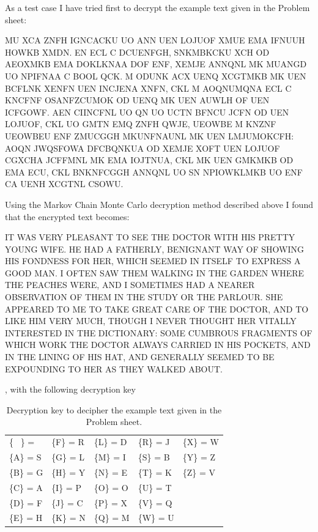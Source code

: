\documentclass[a4paper, 11pt]{article}
\begin{document}
As a test case I have tried first to decrypt the example text given in the
Problem sheet:

\begin{adjustwidth}{2.5em}{0pt}
  \small
  MU XCA ZNFH IGNCACKU UO ANN UEN LOJUOF XMUE EMA IFNUUH
  HOWKB XMDN. EN ECL C DCUENFGH, SNKMBKCKU XCH OD AEOXMKB
  EMA DOKLKNAA DOF ENF, XEMJE ANNQNL MK MUANGD UO NPIFNAA 
  C BOOL QCK. M ODUNK ACX UENQ XCGTMKB MK UEN BCFLNK
  XENFN UEN INCJENA XNFN, CKL M AOQNUMQNA ECL C KNCFNF
  OSANFZCUMOK OD UENQ MK UEN AUWLH OF UEN ICFGOWF. AEN
  CIINCFNL UO QN UO UCTN BFNCU JCFN OD UEN LOJUOF, CKL UO
  GMTN EMQ ZNFH QWJE, UEOWBE M KNZNF UEOWBEU ENF ZMUCGGH
  MKUNFNAUNL MK UEN LMJUMOKCFH: AOQN JWQSFOWA DFCBQNKUA
  OD XEMJE XOFT UEN LOJUOF CGXCHA JCFFMNL MK EMA IOJTNUA,
  CKL MK UEN GMKMKB OD EMA ECU, CKL BNKNFCGGH ANNQNL UO
  SN NPIOWKLMKB UO ENF CA UENH XCGTNL CSOWU.
\end{adjustwidth}

Using the Markov Chain Monte Carlo decryption method described above I found 
that the encrypted text becomes:

\begin{adjustwidth}{2.5em}{0pt}
  \small
  IT WAS VERY PLEASANT TO SEE THE DOCTOR WITH HIS PRETTY
  YOUNG WIFE. HE HAD A FATHERLY, BENIGNANT WAY OF SHOWING
  HIS FONDNESS FOR HER, WHICH SEEMED IN ITSELF TO EXPRESS 
  A GOOD MAN. I OFTEN SAW THEM WALKING IN THE GARDEN
  WHERE THE PEACHES WERE, AND I SOMETIMES HAD A NEARER
  OBSERVATION OF THEM IN THE STUDY OR THE PARLOUR. SHE
  APPEARED TO ME TO TAKE GREAT CARE OF THE DOCTOR, AND TO
  LIKE HIM VERY MUCH, THOUGH I NEVER THOUGHT HER VITALLY
  INTERESTED IN THE DICTIONARY: SOME CUMBROUS FRAGMENTS
  OF WHICH WORK THE DOCTOR ALWAYS CARRIED IN HIS POCKETS,
  AND IN THE LINING OF HIS HAT, AND GENERALLY SEEMED TO
  BE EXPOUNDING TO HER AS THEY WALKED ABOUT.
\end{adjustwidth}

, with the following decryption key

\begin{table}[h]
  \centering
  \caption{Decryption key to decipher the example text given in the
  Problem sheet.}
  \begin{tabular}{l l l l l}
\{ \ \} =    &  \{F\} = R  &  \{L\} = D  &  \{R\} = J  &  \{X\} = W  \\
\{A\} = S  &  \{G\} = L  &  \{M\} = I  &  \{S\} = B  &  \{Y\} = Z  \\
\{B\} = G  &  \{H\} = Y  &  \{N\} = E  &  \{T\} = K  &  \{Z\} = V  \\
\{C\} = A  &  \{I\} = P  &  \{O\} = O  &  \{U\} = T  &  \ \\
\{D\} = F  &  \{J\} = C  &  \{P\} = X  &  \{V\} = Q  &  \ \\
\{E\} = H  &  \{K\} = N  &  \{Q\} = M  &  \{W\} = U  &  \ \\
  \end{tabular}
  \label{tab:ExampleKey}
\end{table}
\end{document}
